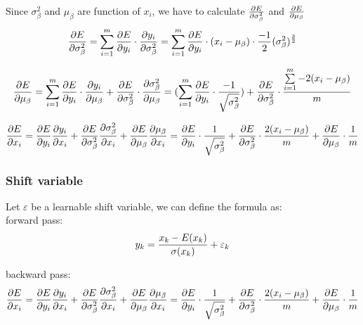 \documentclass[final]{siamltexmm}
\begin{document}
Since $\sigma^2_\beta$ and $\mu_\beta$ are function of $x_i$, we have to calculate ${\partial E \over \partial \sigma^2_\beta}$ and ${\partial E \over \partial \mu_\beta}$
\begin{equation}
{\partial E \over \partial \sigma^2_\beta}=\sum\limits_{i=1}^{m} {\partial E \over \partial y_i}\cdot {\partial y_i \over \partial \sigma^2_\beta} 
=\sum\limits_{i=1}^{m} {\partial E \over \partial y_i}\cdot (x_i-\mu_\beta) \cdot {-1 \over 2} (\sigma^2_\beta)^{3 \over 2}
\end{equation}

\begin{equation}
{\partial E \over \partial \mu_\beta}=
\sum\limits_{i=1}^{m} {\partial E \over \partial y_i}\cdot {\partial y_i \over \partial \mu_\beta} + {\partial E \over \partial \sigma^2_\beta} \cdot {\partial \sigma^2_\beta \over \partial \mu_\beta}
=(\sum\limits_{i=1}^{m} {\partial E \over \partial y_i}\cdot {-1 \over {\sqrt{\sigma^2_\beta}}})+ {\partial E \over \partial \sigma^2_\beta} \cdot {{\sum\limits_{i=1}^{m}{-2(x_i-\mu_\beta)}} \over {m}}
\end{equation}

\begin{equation}
{\partial E\over \partial x_i}={\partial E\over \partial y_i} {\partial y_i\over \partial x_i}+{\partial E\over \partial \sigma^2_\beta} {\partial \sigma^2_\beta \over \partial x_i}+{\partial E\over \partial \mu_\beta} {\partial \mu_\beta\over \partial x_i}
={\partial E\over \partial y_i} \cdot {1 \over {\sqrt{\sigma^2_\beta}}}+{\partial E\over \partial \sigma^2_\beta} \cdot {2(x_i-\mu_\beta) \over {m}}+{\partial E\over \partial \mu_\beta}\cdot{1 \over m}
\end{equation}

\subsubsection{Shift variable}
Let $\varepsilon$ be a learnable shift variable, we can define the formula as:\\
forward pass:
\begin{equation}
y_k={x_k-E(x_k)\over {\sigma(x_k)}}+\varepsilon_k
\end{equation}

backward pass:
\begin{equation}
{\partial E\over \partial x_i}={\partial E\over \partial y_i} {\partial y_i\over \partial x_i}+{\partial E\over \partial \sigma^2_\beta} {\partial \sigma^2_\beta \over \partial x_i}+{\partial E\over \partial \mu_\beta} {\partial \mu_\beta\over \partial x_i}
={\partial E\over \partial y_i} \cdot {1 \over {\sqrt{\sigma^2_\beta}}}+{\partial E\over \partial \sigma^2_\beta} \cdot {2(x_i-\mu_\beta) \over {m}}+{\partial E\over \partial \mu_\beta}\cdot{1 \over m}
\end{equation}
\end{document}

